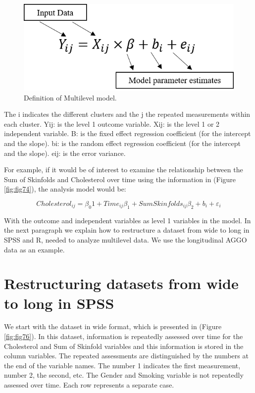 \documentclass[]{book}
\begin{document}
\begin{figure}

{\centering \includegraphics[width=0.4\linewidth]{images/fig7.5} 

}

\caption{Definition of Multilevel model.}\label{fig:fig75}
\end{figure}

The i indicates the different clusters and the j the repeated
measurements within each cluster. Yij: is the level 1 outcome variable.
Xij: is the level 1 or 2 independent variable. B: is the fixed effect
regression coefficient (for the intercept and the slope). bi: is the
random effect regression coefficient (for the intercept and the slope).
eij: is the error variance.

For example, if it would be of interest to examine the relationship
between the Sum of Skinfolds and Cholesterol over time using the
information in (Figure \ref{fig:fig74}), the analysis model would be:

\[Cholesterol_{ij} = \beta_0 1 + Time_{ij}\beta_1 + SumSkinfolds_{ij}\beta_2 + b_i + \varepsilon_i\]

With the outcome and independent variables as level 1 variables in the
model. In the next paragraph we explain how to restructure a dataset
from wide to long in SPSS and R, needed to analyze multilevel data. We
use the longitudinal AGGO data as an example.

\section{Restructuring datasets from wide to long in
SPSS}\label{restructuring-datasets-from-wide-to-long-in-spss}

We start with the dataset in wide format, which is presented in (Figure
\ref{fig:fig76}). In this dataset, information is repeatedly assessed
over time for the Cholesterol and Sum of Skinfold variables and this
information is stored in the column variables. The repeated assessments
are distinguished by the numbers at the end of the variable names. The
number 1 indicates the first measurement, number 2, the second, etc. The
Gender and Smoking variable is not repeatedly assessed over time. Each
row represents a separate case.
\end{document}
